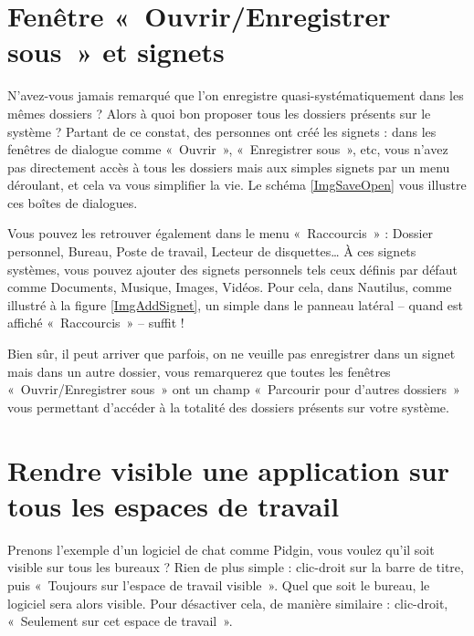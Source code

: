 \section{Fenêtre «~Ouvrir/Enregistrer sous~» et signets}
\label{RefSignets}
N'avez-vous jamais remarqué que l'on enregistre quasi-systématiquement dans les mêmes dossiers ? Alors à quoi bon proposer tous les dossiers présents sur le système ? Partant de ce constat, des personnes ont créé les signets : dans les fenêtres de dialogue comme «~Ouvrir~», «~Enregistrer sous~», etc, vous n'avez pas directement accès à tous les dossiers mais aux simples signets par un menu déroulant, et cela va vous simplifier la vie. Le schéma \ref{ImgSaveOpen} vous illustre ces boîtes de dialogues.\par
{}
Vous pouvez les retrouver également dans le menu «~Raccourcis~» : Dossier personnel, Bureau, Poste de travail, Lecteur de disquettes\ldots{} À ces signets systèmes, vous pouvez ajouter des signets personnels tels ceux définis par défaut comme Documents, Musique, Images, Vidéos. Pour cela, dans Nautilus, comme illustré à la figure \ref{ImgAddSignet}, un simple  dans le panneau latéral -- quand est affiché «~Raccourcis~» -- suffit !\par
{}
Bien sûr, il peut arriver que parfois, on ne veuille pas enregistrer dans un signet mais dans un autre dossier, vous remarquerez que toutes les fenêtres «~Ouvrir/Enregistrer sous~» ont un champ «~Parcourir pour d'autres dossiers~» vous permettant d'accéder à la totalité des dossiers présents sur votre système.
\section{Rendre visible une application sur tous les espaces de travail}
Prenons l'exemple d'un logiciel de chat comme Pidgin, vous voulez qu'il soit visible sur tous les bureaux ? Rien de plus simple : clic-droit sur la barre de titre, puis «~Toujours sur l'espace de travail visible~». Quel que soit le bureau, le logiciel sera alors visible. Pour désactiver cela, de manière similaire : clic-droit, «~Seulement sur cet espace de travail~».
